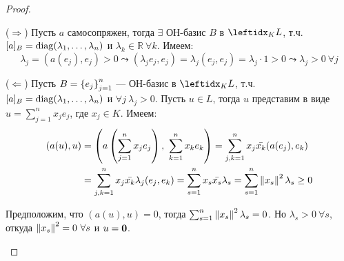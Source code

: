 \begin{proof}
    \begin{proofpart}{($\Rightarrow$)}
        Пусть $a$ самосопряжен, тогда $\exists$ ОН-базис $B$ в $\lsub{K}{L}$, т.ч. $[a]_B = \operatorname{diag}(\lambda_1, \dots, \lambda_n)$ и $\lambda_k \in \mathbb{R}\ \forall k$. Имеем:
        $$\lambda_j = (a(e_j), e_j) > 0 \leadsto (\lambda_j e_j, e_j) = \lambda_j (e_j, e_j) = \lambda_j \cdot 1 > 0 \leadsto \lambda_j > 0\ \forall j$$
    \end{proofpart}

    \begin{proofpart}{($\Leftarrow$)}
        Пусть $B = \left\{e_j\right\}_{j=1}^{n}$ --- ОН-базис в $\lsub{K}{L}$, т.ч. $[a]_B = \operatorname{diag}(\lambda_1, \dots, \lambda_n)$ и $\forall j\ \lambda_j > 0$. Пусть $u \in L$, тогда $u$ представим в виде $u = \sum_{j=1}^n x_j e_j$, где $x_j \in K$. Имеем:
        \begin{align*}
            (a(u), u) &= \left(a\left(\sum_{j=1}^n x_j e_j\right),\ \sum_{k=1}^n x_k e_k\right) = \sum_{j,k=1}^n x_j \bar{x_k} (a(e_j), e_k) \\
            &= \sum_{j,k=1}^n x_j \bar{x_k} \lambda_j (e_j, e_k) = \sum_{s=1}^n x_s \bar{x_s} \lambda_s = \sum_{s=1}^n \norm{x_s}^2 \lambda_s \ge 0
        \end{align*}
        
        Предположим, что $(a(u), u) = 0$, тогда $\sum_{s=1}^n \left\lVert x_s\right\rVert^2 \lambda_s = 0$. Но $\lambda_s > 0\ \forall s$, откуда $\left\lVert x_s\right\rVert^2 = 0\ \forall s$ и $u = \mathbf{0}$.
    \end{proofpart}
\end{proof}